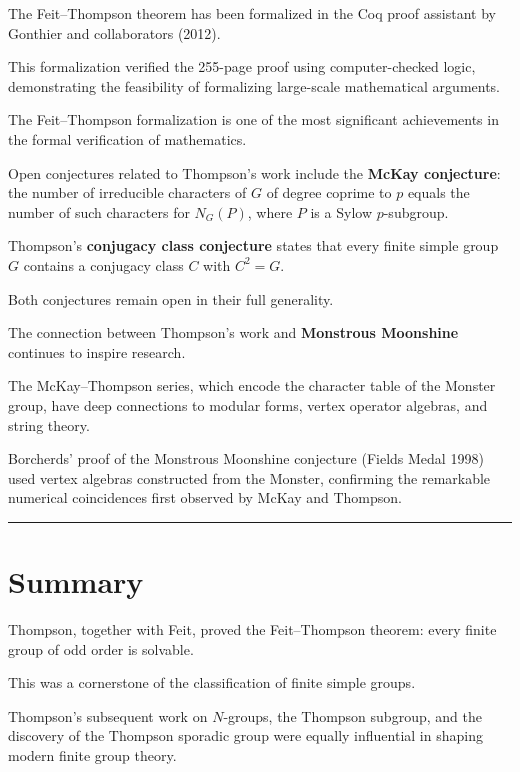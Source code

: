 The Feit--Thompson theorem has been formalized in the Coq proof assistant by Gonthier and collaborators (2012).

This formalization verified the 255-page proof using computer-checked logic, demonstrating the feasibility of formalizing large-scale mathematical arguments.

The Feit--Thompson formalization is one of the most significant achievements in the formal verification of mathematics.

Open conjectures related to Thompson's work include the \textbf{McKay conjecture}: the number of irreducible characters of $G$ of degree coprime to $p$ equals the number of such characters for $N_G(P)$, where $P$ is a Sylow $p$-subgroup.

Thompson's \textbf{conjugacy class conjecture} states that every finite simple group $G$ contains a conjugacy class $C$ with $C^2 = G$.

Both conjectures remain open in their full generality.

The connection between Thompson's work and \textbf{Monstrous Moonshine} continues to inspire research.

The McKay--Thompson series, which encode the character table of the Monster group, have deep connections to modular forms, vertex operator algebras, and string theory.

Borcherds' proof of the Monstrous Moonshine conjecture (Fields Medal 1998) used vertex algebras constructed from the Monster, confirming the remarkable numerical coincidences first observed by McKay and Thompson.

\begin{center}\rule{0.5\linewidth}{0.5pt}\end{center}

\section*{Summary}

Thompson, together with Feit, proved the Feit--Thompson theorem: every finite group of odd order is solvable.

This was a cornerstone of the classification of finite simple groups.

Thompson's subsequent work on $N$-groups, the Thompson subgroup, and the discovery of the Thompson sporadic group were equally influential in shaping modern finite group theory.
